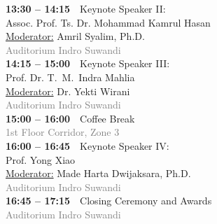\documentclass[10pt,a4paper]{article}
\begin{document}
\begin{minipage}[t]{0.48\textwidth}
\textbf{13:30 -- 14:15}~~Keynote Speaker II:\\
{Assoc. Prof. Ts. Dr. Mohammad Kamrul Hasan}\\
\underline{Moderator:} Amril Syalim, Ph.D. \\
\textcolor{gray}{Auditorium Indro Suwandi}\\

\textbf{14:15 -- 15:00}~~Keynote Speaker III:\\
{Prof. Dr. T.\ M.\ Indra Mahlia}\\
\underline{Moderator:} Dr. Yekti Wirani \\
\textcolor{gray}{Auditorium Indro Suwandi}\\

\textbf{15:00 -- 16:00}~~Coffee Break\\
\textcolor{gray}{1st Floor Corridor, Zone 3}\\

\textbf{16:00 -- 16:45}~~Keynote Speaker IV:\\
{Prof. Yong Xiao}\\
\underline{Moderator:} Made Harta Dwijaksara, Ph.D. \\
\textcolor{gray}{Auditorium Indro Suwandi}\\

\textbf{16:45 -- 17:15}~~Closing Ceremony and Awards\\
\textcolor{gray}{Auditorium Indro Suwandi}

\end{minipage}

\clearpage
\end{document}
